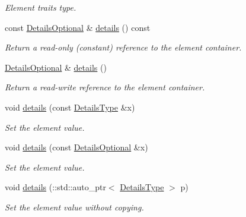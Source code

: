 \begin{DoxyCompactItemize}
\begin{DoxyCompactList}\small\item\em Element traits type. \item\end{DoxyCompactList}\item 
const \hyperlink{classopenstack_1_1xml_1_1CloudServersAPIFault_ab0cea94caf240d5baaa0cfe7a5f52758}{DetailsOptional} \& \hyperlink{classopenstack_1_1xml_1_1CloudServersAPIFault_a941d39880fad60ebe28c8eb17e77fd77}{details} () const 
\begin{DoxyCompactList}\small\item\em Return a read-\/only (constant) reference to the element container. \item\end{DoxyCompactList}\item 
\hyperlink{classopenstack_1_1xml_1_1CloudServersAPIFault_ab0cea94caf240d5baaa0cfe7a5f52758}{DetailsOptional} \& \hyperlink{classopenstack_1_1xml_1_1CloudServersAPIFault_ad7e443273c26f0a73665cea96e3147ea}{details} ()
\begin{DoxyCompactList}\small\item\em Return a read-\/write reference to the element container. \item\end{DoxyCompactList}\item 
void \hyperlink{classopenstack_1_1xml_1_1CloudServersAPIFault_a9e9a1e2c34e711c446b4827571de91b9}{details} (const \hyperlink{classopenstack_1_1xml_1_1CloudServersAPIFault_a557ef1bc026914c9fab01c3390f1843e}{DetailsType} \&x)
\begin{DoxyCompactList}\small\item\em Set the element value. \item\end{DoxyCompactList}\item 
void \hyperlink{classopenstack_1_1xml_1_1CloudServersAPIFault_a58ed18404be9bf11535cc3d1a2e211eb}{details} (const \hyperlink{classopenstack_1_1xml_1_1CloudServersAPIFault_ab0cea94caf240d5baaa0cfe7a5f52758}{DetailsOptional} \&x)
\begin{DoxyCompactList}\small\item\em Set the element value. \item\end{DoxyCompactList}\item 
void \hyperlink{classopenstack_1_1xml_1_1CloudServersAPIFault_ae526944db9f24a642ce88c96f17ec31e}{details} (::std::auto\_\-ptr$<$ \hyperlink{classopenstack_1_1xml_1_1CloudServersAPIFault_a557ef1bc026914c9fab01c3390f1843e}{DetailsType} $>$ p)
\begin{DoxyCompactList}\small\item\em Set the element value without copying. \item\end{DoxyCompactList}\end{DoxyCompactItemize}
